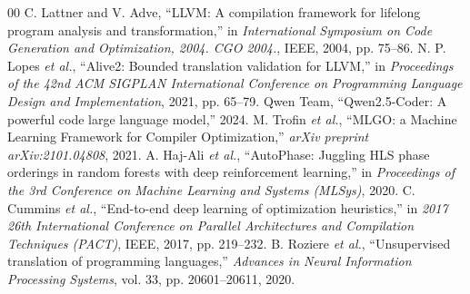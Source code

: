 \documentclass[conference,10pt]{IEEEtran}
\begin{document}
\begin{thebibliography}{00}
 C. Lattner and V. Adve, ``LLVM: A compilation framework for lifelong program analysis and transformation,'' in \textit{International Symposium on Code Generation and Optimization, 2004. CGO 2004.}, IEEE, 2004, pp. 75--86.
 N. P. Lopes \textit{et al.}, ``Alive2: Bounded translation validation for LLVM,'' in \textit{Proceedings of the 42nd ACM SIGPLAN International Conference on Programming Language Design and Implementation}, 2021, pp. 65--79.
 Qwen Team, ``Qwen2.5-Coder: A powerful code large language model,'' 2024.
 M. Trofin \textit{et al.}, ``MLGO: a Machine Learning Framework for Compiler Optimization,'' \textit{arXiv preprint arXiv:2101.04808}, 2021.
 A. Haj-Ali \textit{et al.}, ``AutoPhase: Juggling HLS phase orderings in random forests with deep reinforcement learning,'' in \textit{Proceedings of the 3rd Conference on Machine Learning and Systems (MLSys)}, 2020.
 C. Cummins \textit{et al.}, ``End-to-end deep learning of optimization heuristics,'' in \textit{2017 26th International Conference on Parallel Architectures and Compilation Techniques (PACT)}, IEEE, 2017, pp. 219--232.
 B. Roziere \textit{et al.}, ``Unsupervised translation of programming languages,'' \textit{Advances in Neural Information Processing Systems}, vol. 33, pp. 20601--20611, 2020.
\end{thebibliography}
\end{document}

